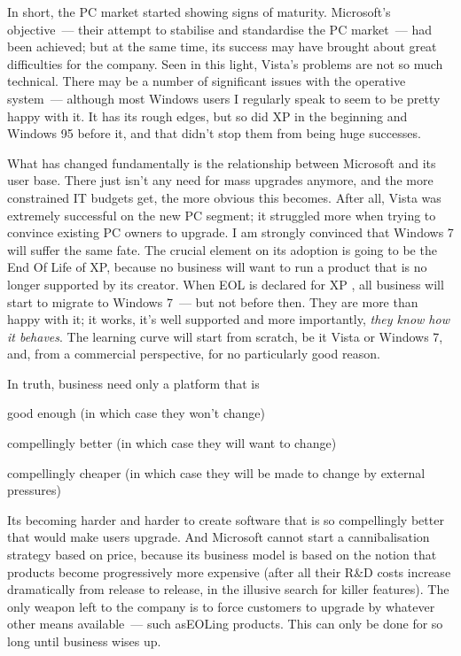 \documentclass{memoir}
\begin{document}
In short, the PC market started showing signs of maturity. Microsoft's
objective~--- their attempt to stabilise and standardise the PC
market~--- had been achieved; but at the same time, its success may
have brought about great difficulties for the company. Seen in this
light, Vista's problems are not so much technical. There may be a
number of significant issues with the operative system~--- although most
Windows users I regularly speak to seem to be pretty happy with it. It
has its rough edges, but so did XP in the beginning and Windows 95
before it, and that didn't stop them from being huge successes.

What has changed fundamentally is the relationship between Microsoft
and its user base. There just isn't any need for mass upgrades
anymore, and the more constrained IT budgets get, the more obvious
this becomes. After all, Vista was extremely successful on the new PC
segment; it struggled more when trying to convince existing PC owners
to upgrade. I am strongly convinced that Windows 7 will suffer the
same fate. The crucial element on its adoption is going to be the End
Of Life of XP, because no business will want to run a product that is
no longer supported by its creator. When EOL is declared for XP , all
business will start to migrate to Windows 7~--- but not before
then. They are more than happy with it; it works, it's well supported
and more importantly, \emph{they know how it behaves}. The learning
curve will start from scratch, be it Vista or Windows 7, and, from a
commercial perspective, for no particularly good reason.

In truth, business need only a platform that is
\begin{inparaenum}
\item good enough (in which case they won't change)
\item compellingly better (in which case they will want to change)
\item compellingly cheaper (in which case they will be made to change
  by external pressures)
\end{inparaenum}

Its becoming harder and harder to create software that is so
compellingly better that would make users upgrade. And Microsoft
cannot start a cannibalisation strategy based on price, because its
business model is based on the notion that products become
progressively more expensive (after all their R\&D costs increase
dramatically from release to release, in the illusive search for
killer features). The only weapon left to the company is to force
customers to upgrade by whatever other means available~--- such asEOLing
products. This can only be done for so long until business wises up.
\end{document}

